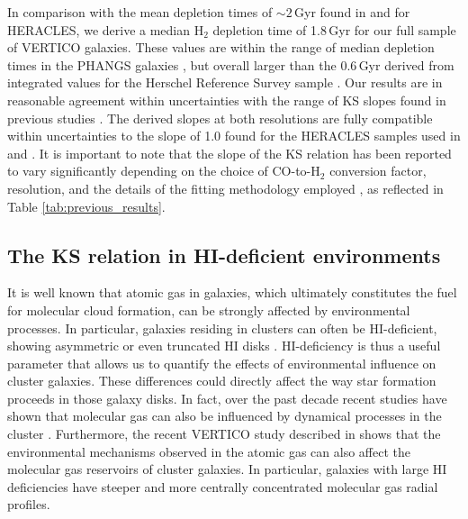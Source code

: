\documentclass[longauth]{aa}
\begin{document}
\noindent In comparison with the mean depletion times of $\sim2$\,Gyr found in \citet{Bigiel2008} and \citet{Leroy2013} for HERACLES, we derive a median H$_2$ depletion time of 1.8\,Gyr for our full sample of VERTICO galaxies. These values are within the range of median depletion times in the PHANGS galaxies \citep[1.18 to 2.10 Gyr,][]{Utomo2018,Querejeta2021}, but overall larger than the 0.6\,Gyr derived from integrated values for the Herschel Reference Survey sample \citep{Boselli2014b}. Our results are in reasonable agreement within uncertainties with the range of KS slopes found in previous studies \citep[e.g.,][see Table \ref{tab:previous_results}]{Bigiel2008,Usero2015,Lin2019,Ellison2021,Pessa2021,Querejeta2021}. The derived slopes at both resolutions are fully compatible within uncertainties to the slope of 1.0 found for the HERACLES samples used in \citet{Bigiel2008} and \citet{Leroy2013}. It is important to note that the slope of the KS relation has been reported to vary significantly depending on the choice of CO-to-H$_2$ conversion factor, resolution, and the details of the fitting methodology employed \citep[e.g.,][]{Leroy2013,Ellison2021,Querejeta2021}, as reflected in Table \ref{tab:previous_results}.

\subsection{The KS relation in HI-deficient environments}

It is well known that atomic gas in galaxies, which ultimately constitutes the fuel for molecular cloud formation, can be strongly affected by environmental
processes. In particular, galaxies residing in clusters can often be HI-deficient, showing asymmetric or even truncated HI disks \citep{Koopmann2004,Chung2009,Taylor2013,Yoon2017}. HI-deficiency is thus a useful parameter that allows us to quantify the effects of environmental influence on cluster galaxies. These differences could directly affect the way star formation proceeds in those galaxy disks. In fact, over the past decade recent studies have shown that molecular gas can also be influenced by dynamical processes in the cluster \citep{Vollmer2008,Fumagalli2009,Boselli2014,Zabel2019,Moretti2020}. Furthermore, the recent VERTICO study described in \citet{Zabel2022} shows that the environmental mechanisms observed in the atomic gas can also affect the molecular gas reservoirs of cluster galaxies. In particular, galaxies with large HI deficiencies have steeper and more centrally concentrated molecular gas radial profiles.
\end{document}
